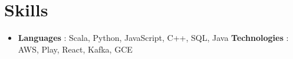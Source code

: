 \documentclass[letterpaper,11pt]{article}
\newif\ifrussian
\newcommand{\text}[2]{%
  \ifrussian#2\else#1\fi%
}
\newcommand{\resumeSubHeadingListStart}{\begin{itemize}[leftmargin=*]}
\newcommand{\resumeSubHeadingListEnd}{\end{itemize}}
\begin{document}
\section
 {\text
  {Skills}
  {Навыки}}
\resumeSubHeadingListStart
\item
      {\textbf
            {\text
              {Languages}
              {Языки}}: Scala, Python, JavaScript, C++, SQL, Java
            \hfill
            \textbf
            {\text
              {Technologies}
              {Технологии}}: AWS, Play, React, Kafka, GCE}
\resumeSubHeadingListEnd
\end{document}
